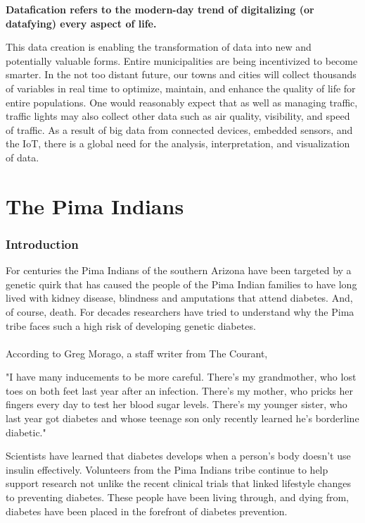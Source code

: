 \documentclass[12pt]{article}
\begin{document}
\textbf{Datafication refers to the modern-day trend of digitalizing (or datafying) every aspect of life.}

This data creation is enabling the transformation of data into new and potentially valuable forms. Entire municipalities are being incentivized to become smarter. In the not too distant future, our towns and cities will collect thousands of variables in real time to optimize, maintain, and enhance the quality of life for entire populations. One would reasonably expect that as well as managing traffic, traffic lights may also collect other data such as air quality, visibility, and speed of traffic. As a result of big data from connected devices, embedded sensors, and the IoT, there is a global need for the analysis, interpretation, and visualization of data.

\newpage
\part{The Pima Indians}
\section{Introduction}

For centuries the Pima Indians of the southern Arizona have been targeted by a genetic quirk that has caused the people of the Pima Indian families to have long lived with kidney disease, blindness and amputations that attend diabetes. And, of course, death. For decades researchers have tried to understand why the Pima tribe faces such a high risk of developing genetic diabetes.
\\\\
According to Greg Morago, a staff writer from The Courant,
\begin{displayquote}
"I have many inducements to be more careful. There's my grandmother, who lost toes on both feet last year after an infection. There's my mother, who pricks her fingers every day to test her blood sugar levels. There's my younger sister, who last year got diabetes and whose teenage son only recently learned he's borderline diabetic."
\end{displayquote}

Scientists have learned that diabetes develops when a person's body doesn't use insulin effectively. Volunteers from the Pima Indians tribe continue to help support research not unlike the recent clinical trials that linked lifestyle changes to preventing diabetes. These people have been living through, and dying from, diabetes have been placed in the forefront of diabetes prevention. 
\end{document}
